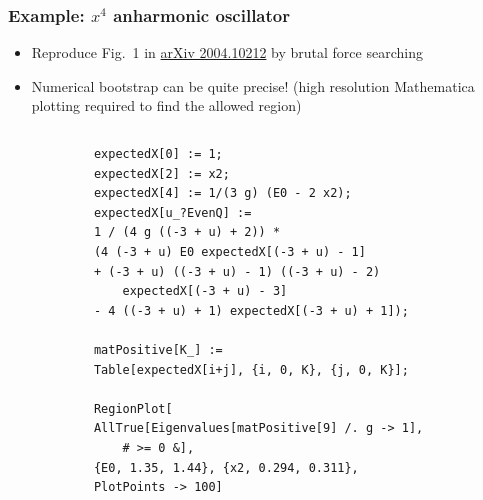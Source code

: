 \documentclass{beamer}
\begin{document}
\begin{frame}[fragile]
\frametitle{Example: $x^4$ anharmonic oscillator}

\begin{itemize}
    \item Reproduce Fig.~1 in \href{https://arxiv.org/abs/2004.10212}{arXiv 2004.10212} by brutal force searching
    \item Numerical bootstrap can be quite precise! (high resolution Mathematica plotting required to find the allowed region)
\end{itemize}

\begin{columns}
    
    \begin{column}{0.5\textwidth}
        \lstset{language=Mathematica, basicstyle=\tiny, xleftmargin=-40pt}
        \begin{lstlisting}
            expectedX[0] := 1;
            expectedX[2] := x2;
            expectedX[4] := 1/(3 g) (E0 - 2 x2);
            expectedX[u_?EvenQ] := 
            1 / (4 g ((-3 + u) + 2)) * 
            (4 (-3 + u) E0 expectedX[(-3 + u) - 1] 
            + (-3 + u) ((-3 + u) - 1) ((-3 + u) - 2) 
                expectedX[(-3 + u) - 3] 
            - 4 ((-3 + u) + 1) expectedX[(-3 + u) + 1]);

            matPositive[K_] := 
            Table[expectedX[i+j], {i, 0, K}, {j, 0, K}];

            RegionPlot[
            AllTrue[Eigenvalues[matPositive[9] /. g -> 1], 
                # >= 0 &], 
            {E0, 1.35, 1.44}, {x2, 0.294, 0.311}, 
            PlotPoints -> 100]
        \end{lstlisting}
    \end{column}


\end{columns}
\end{frame}
\end{document}
